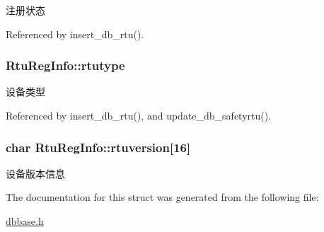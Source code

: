注册状态 



Referenced by insert\-\_\-db\-\_\-rtu().

\hypertarget{structRtuRegInfo_ac8d17922e46094960fb8c88d9ad370c5}{
\subsubsection[{rtutype}]{ Rtu\-Reg\-Info\-::rtutype}}\label{structRtuRegInfo_ac8d17922e46094960fb8c88d9ad370c5}


设备类型 



Referenced by insert\-\_\-db\-\_\-rtu(), and update\-\_\-db\-\_\-safetyrtu().

\hypertarget{structRtuRegInfo_a3e6ef94328a1a1f1246bf7a7f91b4e2b}{
\subsubsection[{rtuversion}]{\setlength{\rightskip}{0pt plus 5cm}char Rtu\-Reg\-Info\-::rtuversion\mbox{[}16\mbox{]}}}\label{structRtuRegInfo_a3e6ef94328a1a1f1246bf7a7f91b4e2b}


设备版本信息 



The documentation for this struct was generated from the following file\-:\begin{DoxyCompactItemize}
\item 
\hyperlink{dbbase_8h}{dbbase.\-h}\end{DoxyCompactItemize}
